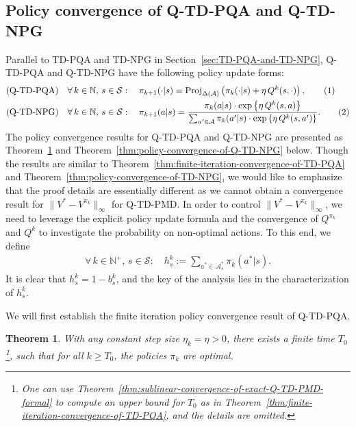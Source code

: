 \documentclass[10pt]{article}
\newcommand{\Proj}{\text{Proj}}
\newcommand{\calA}{\mathcal{A}}
\newcommand{\calS}{\mathcal{S}}
\newcommand{\ls}{\left}
\newcommand{\rs}{\right}
\newcommand\numberthis{\addtocounter{equation}{1}\tag{\theequation}}
\theoremstyle{plain}
\newtheorem{theorem}{Theorem}[section]
\theoremstyle{definition}
\begin{document}
\subsection{Policy convergence of Q-TD-PQA and Q-TD-NPG}
Parallel to TD-PQA and TD-NPG in Section~\ref{sec:TD-PQA-and-TD-NPG}, Q-TD-PQA and Q-TD-NPG have the following policy update forms:
\begin{align*}
    &\mbox{(Q-TD-PQA)} \quad \forall\, k\in\mathbb{N}, \, s\in\calS: \quad \pi_{k+1}(\cdot|s) = \Proj_{\Delta(\calA)} \ls( \pi_k(\cdot|s) + \eta\, Q^k(s,\cdot) \rs), \numberthis
    \label{eq:Q-TD-PQA-update} \\
    &\mbox{(Q-TD-NPG)} \quad \forall\, k\in\mathbb{N}, \, s\in\calS: \quad \pi_{k+1}(a|s) = \frac{\pi_k(a|s) \cdot \exp \ls\{ \eta\, Q^k(s,a) \rs\}}{\sum_{a^\prime\in\calA} \pi_k(a^\prime|s) \cdot \exp \ls\{ \eta\, Q^k(s,a^\prime) \rs\}}. \numberthis
    \label{eq:Q-TD-NPG-update}
\end{align*}
The policy convergence results for Q-TD-PQA and Q-TD-NPG are presented as Theorem~\ref{thm:finite-iteration-convergence-of-Q-TD-PQA} and Theorem~\ref{thm:policy-convergence-of-Q-TD-NPG} below. Though the results are similar to Theorem~\ref{thm:finite-iteration-convergence-of-TD-PQA} and Theorem~\ref{thm:policy-convergence-of-TD-NPG}, we would like to emphasize that the proof details are essentially different  as we cannot obtain a convergence result for $\| V^* - V^{\pi_k} \|_\infty$ for Q-TD-PMD. In order to control $\| V^* - V^{\pi_k} \|_\infty$, we need to leverage the explicit policy update formula and the convergence of $Q^{\pi_k}$ and $Q^k$ to investigate the probability on non-optimal actions. To this end, we define
\begin{align*}
    \forall\, k \in \mathbb{N}^+, \, s\in\calS: \quad h_s^k := \sum_{a^*\in\calA^*_s} \pi_k(a^*|s).
\end{align*}
It is clear that $h^k_s = 1 - b_s^k$, and the key of the  analysis lies in the characterization of $h^k_s$. 

We will first establish the finite iteration policy convergence result of Q-TD-PQA.

\begin{theorem}
    With any constant step size $\eta_k = \eta > 0$, there exists a finite time $T_0$\footnote{One can use Theorem~\ref{thm:sublinear-convergence-of-exact-Q-TD-PMD-formal} to compute an upper bound for $T_0$ as in Theorem~\ref{thm:finite-iteration-convergence-of-TD-PQA}, and the details are omitted.}, such that for all $k \geq T_0$, the policies $\pi_k$ are optimal.
    \label{thm:finite-iteration-convergence-of-Q-TD-PQA}
\end{theorem}
\end{document}
